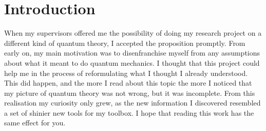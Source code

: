 \documentclass[10pt, a4paper, singlespacing]{report}
\begin{document}
\chapter{Introduction}\label{Introduction}
When my supervisors offered me the possibility of doing my research project on a different kind of quantum theory, I accepted the proposition promptly. 
From early on, my main motivation was to disenfranchise myself from any assumptions about what it meant to do quantum mechanics. I thought that this project could help me in the process of reformulating what I thought I already understood. This did happen, and the more I read about this topic the more I noticed that my picture of quantum theory was not wrong, but it was incomplete. From this realisation my curiosity only grew, as the new information I discovered resembled a set of shinier new tools for my toolbox. I hope that reading this work has the same effect for you.
\end{document}
